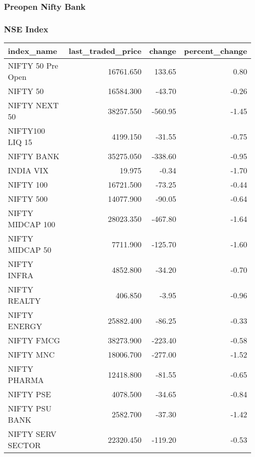 \documentclass[
]{article}
\begin{document}
\hypertarget{preopen-nifty-bank}{%
\subsubsection{Preopen Nifty Bank}\label{preopen-nifty-bank}}

\hypertarget{nse-index}{%
\subsubsection{NSE Index}\label{nse-index}}

\begin{table}
\centering\begingroup\fontsize{12}{14}\selectfont

\begin{tabular}{l|r|r|r}
\hline
index\_name & last\_traded\_price & change & percent\_change\\
\hline
NIFTY 50 Pre Open & 16761.650 & 133.65 & 0.80\\
\hline
NIFTY 50 & 16584.300 & -43.70 & -0.26\\
\hline
NIFTY NEXT 50 & 38257.550 & -560.95 & -1.45\\
\hline
NIFTY100 LIQ 15 & 4199.150 & -31.55 & -0.75\\
\hline
NIFTY BANK & 35275.050 & -338.60 & -0.95\\
\hline
INDIA VIX & 19.975 & -0.34 & -1.70\\
\hline
NIFTY 100 & 16721.500 & -73.25 & -0.44\\
\hline
NIFTY 500 & 14077.900 & -90.05 & -0.64\\
\hline
NIFTY MIDCAP 100 & 28023.350 & -467.80 & -1.64\\
\hline
NIFTY MIDCAP 50 & 7711.900 & -125.70 & -1.60\\
\hline
NIFTY INFRA & 4852.800 & -34.20 & -0.70\\
\hline
NIFTY REALTY & 406.850 & -3.95 & -0.96\\
\hline
NIFTY ENERGY & 25882.400 & -86.25 & -0.33\\
\hline
NIFTY FMCG & 38273.900 & -223.40 & -0.58\\
\hline
NIFTY MNC & 18006.700 & -277.00 & -1.52\\
\hline
NIFTY PHARMA & 12418.800 & -81.55 & -0.65\\
\hline
NIFTY PSE & 4078.500 & -34.65 & -0.84\\
\hline
NIFTY PSU BANK & 2582.700 & -37.30 & -1.42\\
\hline
NIFTY SERV SECTOR & 22320.450 & -119.20 & -0.53\\

\end{tabular}
\end{table}
\end{document}
